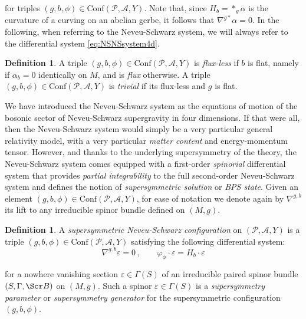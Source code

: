 \documentclass[10pt,reqno,a4paper]{amsart}
\theoremstyle{plain}
\theoremstyle{definition}
\newtheorem{definition}[thm]{Definition}
\theoremstyle{remark}
\theoremstyle{remark}
\def\Conf{\mathrm{Conf}}
\def\cB{\Scr B}
\def\cA{\mathcal{A}}
\def\cP{\mathcal{P}}
\renewcommand{\(}{ (}
\renewcommand{\)}{ )}
\begin{document}
 \noindent
 for triples $(g,b,\phi)\in \Conf(\cP, \cA, Y)$. Note that, since $H_b = \ast_g\alpha$ is the curvature of a curving on an abelian gerbe, it follows that $\nabla^{g\ast}\alpha = 0$. In the following, when referring to the Neveu-Schwarz system, we will always refer to the differential system \eqref{eq:NSNSsystem4d}.
 
 \begin{definition}
 	A triple $(g,b,\phi)\in \Conf(\cP, \cA, Y)$ is \emph{flux-less} if $b$ is flat, namely if $\alpha_b=0$ identically on $M$, and is \emph{flux} otherwise. A triple $(g,b,\phi)\in \Conf(\cP, \cA, Y)$ is \emph{trivial} if its flux-less and $g$ is flat. 
 \end{definition}
 
\noindent
We have introduced the Neveu-Schwarz system as the equations of motion of the bosonic sector of Neveu-Schwarz supergravity in four dimensions. If that were all, then the Neveu-Schwarz system would simply be a very particular general relativity model, with a very particular \emph{matter content} and energy-momentum tensor. However, and thanks to the underlying supersymmetry of the theory, the Neveu-Schwarz system comes equipped with a first-order \emph{spinorial} differential system that provides \emph{partial integrability} to the full second-order Neveu-Schwarz system and defines the notion of \emph{supersymmetric solution} or \emph{BPS state}. Given an element $(g,b,\phi)\in \Conf(\cP, \cA, Y)$, for ease of notation we denote again by $\nabla^{g,b}$ its lift to any irreducible spinor bundle defined on $(M,g)$.

\begin{definition}
A \emph{supersymmetric Neveu-Schwarz configuration} on $(\cP, \cA, Y)$ is a triple $(g,b,\phi) \in \Conf(\cP, \cA, Y)$ satisfying the following differential system:
\begin{equation}
 \label{eq:KSE4d}
 \nabla^{g,b} \varepsilon = 0\, , \qquad  \varphi_{\phi} \cdot \varepsilon = H_b\cdot \varepsilon
 \end{equation}
 	
\noindent
for a nowhere vanishing section $\varepsilon\in\Gamma(S)$ of an irreducible paired spinor bundle $(S,\Gamma,\cB)$  on $(M,g)$. Such a spinor $\varepsilon\in \Gamma(S)$ is a \emph{supersymmetry parameter} or \emph{supersymmetry generator} for the supersymmetric configuration $(g,b,\phi)$.
\end{definition} 
 
\end{document}
